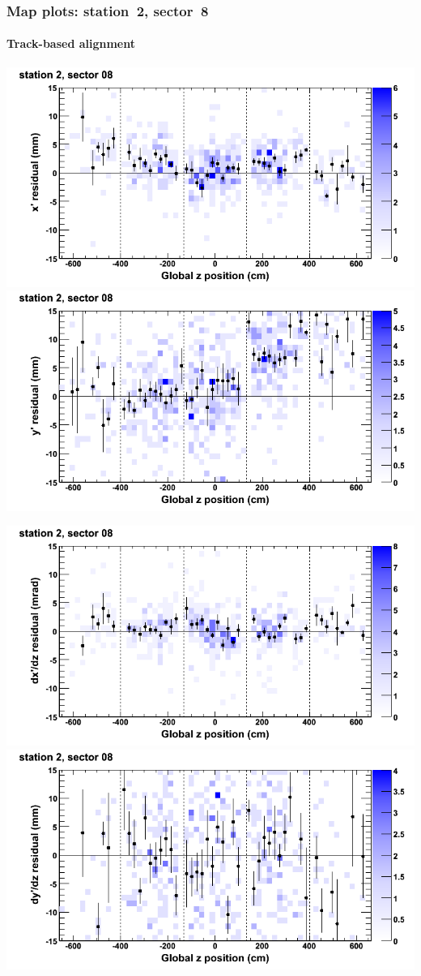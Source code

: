 \documentclass[compress]{beamer}
\begin{document}
\begin{frame}
\frametitle{Map plots: station~2, sector~8}
\framesubtitle{Track-based alignment}
\includegraphics[width=0.5\linewidth]{mapplots_re05/DTvsz_st2sec08_x.png}
\includegraphics[width=0.5\linewidth]{mapplots_re05/DTvsz_st2sec08_y.png}

\includegraphics[width=0.5\linewidth]{mapplots_re05/DTvsz_st2sec08_dxdz.png}
\includegraphics[width=0.5\linewidth]{mapplots_re05/DTvsz_st2sec08_dydz.png}
\end{frame}
\end{document}
